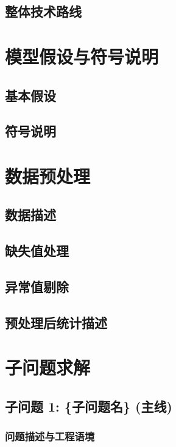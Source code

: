 \documentclass[12pt,a4paper]{ctexart}
\begin{document}
\subsection{整体技术路线}

\section{模型假设与符号说明}

\subsection{基本假设}

\subsection{符号说明}

\section{数据预处理}

\subsection{数据描述}

\subsection{缺失值处理}

\subsection{异常值剔除}

\subsection{预处理后统计描述}

\section{子问题求解}

\subsection{子问题 1: \{子问题名\} (主线)}

\subsubsection{问题描述与工程语境}
\end{document}
